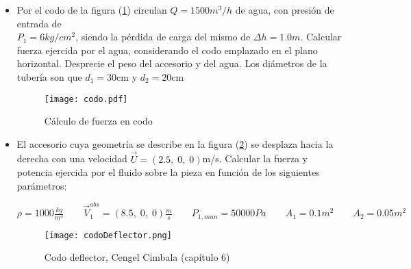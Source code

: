 \begin{itemize}
      
\item Por el codo de la figura (\ref{fig:codo}) circulan $Q=1500 m^3/h$ de agua, con presión de entrada de \\ $P_1 = 6 kg/cm^2$, siendo la pérdida de carga del mismo  de $\Delta h = 1.0m$. Calcular fuerza ejercida por el agua, considerando el codo emplazado en el plano horizontal. Desprecie el peso del accesorio y del agua. Los diámetros de la tubería son que $d_1=30$cm y $d_2=20$cm
  \vspace{0.5cm}
  \begin{figure}[h!!]
  \centering
   \texttt{[image: codo.pdf]}
  \caption{Cálculo de fuerza en codo}
  \label{fig:codo}
  \end{figure}  

\item El accesorio cuya geometría se describe en la figura (\ref{fig:codoDeflector}) se desplaza hacia la derecha con una velocidad $\vec{U} = (2.5,\;0,\;0)$m/s. Calcular la fuerza y potencia ejercida por el fluido sobre la pieza en función de los siguientes parámetros:
\begin{center}
$\rho = 1000 \frac{kg}{m^3} \qquad
\vec{V}^{abs}_1 = (8.5,\;0,\;0) \frac{m}{s} \qquad P_{1,man} = 50000 Pa
\qquad A_1 = 0.1 m^2 \qquad A_2 = 0.05 m^2$
\end{center}

\begin{figure}[h!!]
\centering
\texttt{[image: codoDeflector.png]}
\caption{Codo deflector, Cengel Cimbala (capítulo 6)}
\label{fig:codoDeflector}
\end{figure}

\end{itemize}
